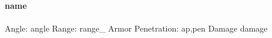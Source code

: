 \ \\
{{\bf {name} }} \\
\ \\
Angle: {angle} Range: {range_} Armor Penetration: {ap},{pen} Damage {damage} \\
 \\



